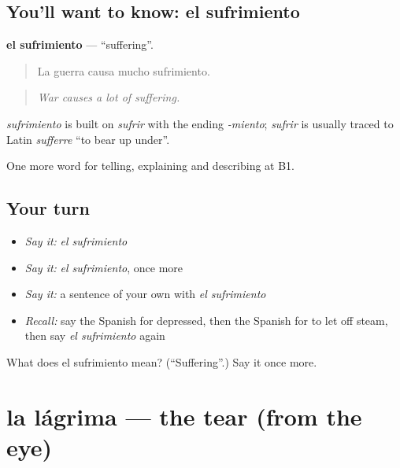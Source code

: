 \subsection*{You'll want to know: el sufrimiento}
\textbf{el sufrimiento} — \textquotedblleft{}suffering\textquotedblright{}.

\begin{quote}
La guerra causa mucho sufrimiento.
\end{quote}

\begin{quote}
\emph{War causes a lot of suffering.}
\end{quote}

\begin{cousinweb}
\emph{sufrimiento} is built on \emph{sufrir} with the ending \emph{-miento}; \emph{sufrir} is usually traced to Latin \emph{sufferre} \textquotedblleft{}to bear up under\textquotedblright{}.
\end{cousinweb}

\begin{grammarlens}[title={What you've built}]
One more word for telling, explaining and describing at B1.
\end{grammarlens}

\subsection*{Your turn}
\begin{itemize}
\raggedright
  \item \emph{Say it:} \emph{el sufrimiento}
  \item \emph{Say it:} \emph{el sufrimiento}, once more
  \item \emph{Say it:} a sentence of your own with \emph{el sufrimiento}
  \item \emph{Recall:} say the Spanish for depressed, then the Spanish for to let off steam, then say \emph{el sufrimiento} again
\end{itemize}

\begin{tcolorbox}[breakable,colback=teal!4,colframe=teal!35!black,title={Before you move on}]
What does el sufrimiento mean? (\textquotedblleft{}Suffering\textquotedblright{}.) Say it once more.
\end{tcolorbox}
\section[la lágrima]{la lágrima — the tear (from the eye)}

